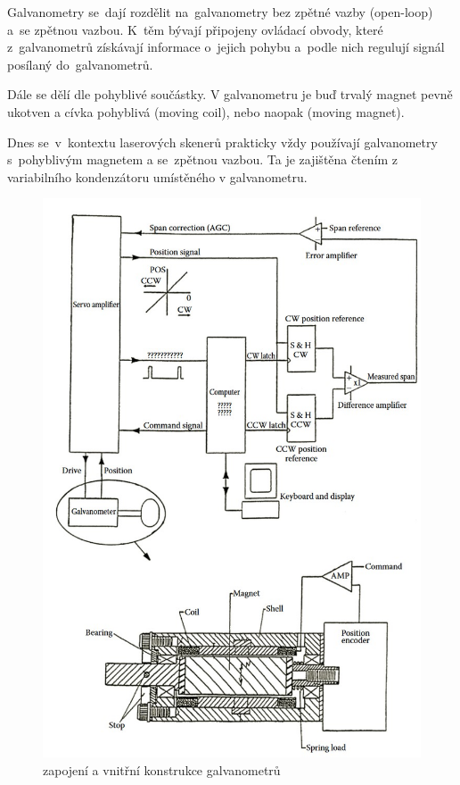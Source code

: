 Galvanometry se~dají rozdělit na~galvanometry bez zpětné vazby (open-loop) a~se zpětnou vazbou. K~těm bývají připojeny ovládací obvody, které z~galvanometrů získávají informace o~jejich pohybu a~podle nich regulují signál posílaný do~galvanometrů.~\cite{wiki-galvo}

Dále se dělí dle pohyblivé součástky. V galvanometru je buď trvalý magnet pevně ukotven a cívka pohyblivá (moving coil), nebo naopak (moving magnet). %

Dnes se~v~kontextu laserových skenerů prakticky vždy používají galvanometry s~pohyblivým magnetem a se~zpětnou vazbou. Ta je zajištěna čtením z variabilního kondenzátoru umístěného v galvanometru.

\begin{figure}[!htb]
  \centering
  \includegraphics[width=1\textwidth]{img/galvanometer-detail.jpg}
  \caption{\label{fig:galvanometer-detail} zapojení a vnitřní konstrukce galvanometrů}
\end{figure}

